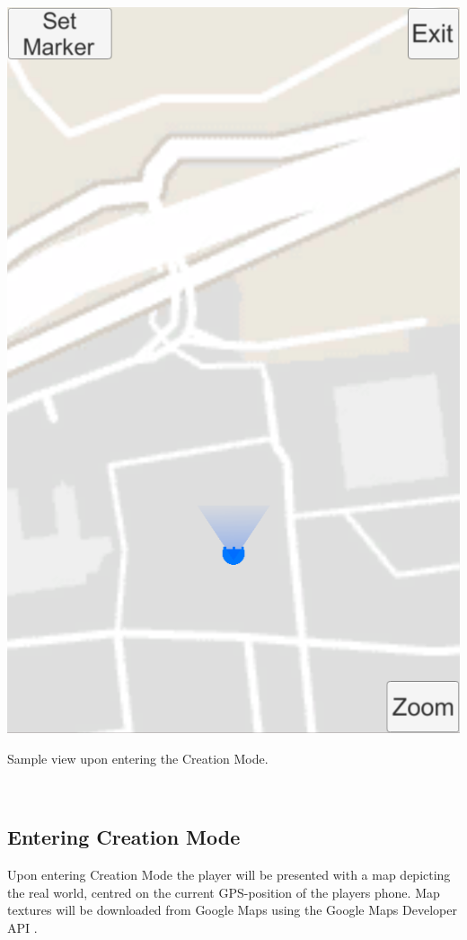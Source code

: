 \documentclass{sigchi-ext}
\begin{document}
\begin{marginfigure}[-35pc]
	\begin{minipage}{\marginparwidth}
		\centering
		\includegraphics[width=0.9\marginparwidth]{figures/CM_Entering}
		\caption{Sample view upon entering the Creation Mode.}~\label{fig:CM_Entering}
	\end{minipage}
\end{marginfigure}

\subsection{Entering Creation Mode}

Upon entering Creation Mode the player will be presented with a map depicting the real world, centred on the current GPS-position of the players phone. Map textures will be downloaded from Google Maps \cite{googlemaps} using the Google Maps Developer API \cite{googlemapsAPI}.
\end{document}
